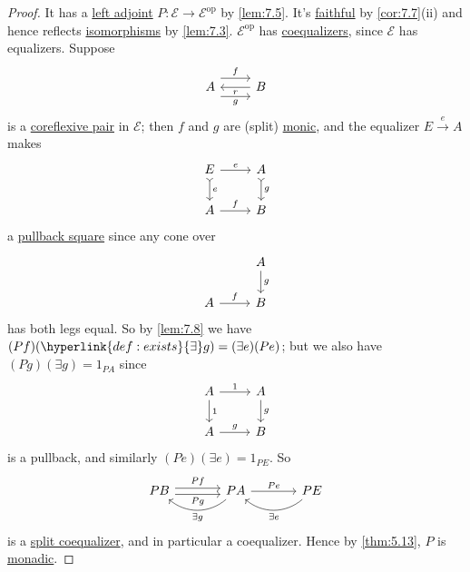 \documentclass{article}
\let\to\longrightarrow
\begin{document}
\begin{proof}
  It has a \hyperlink{def:adj}{left adjoint} $P: \mathscr{E} \to \mathscr{E}^{\text{op}}$ by \cref{lem:7.5}.
  It's \hyperlink{def:full}{faithful} by \cref{cor:7.7}(ii) and hence reflects \hyperlink{def:iso}{isomorphisms} by \cref{lem:7.3}.
  $\mathscr{E}^\text{op}$ has \hyperlink{def:equalizer}{coequalizers}, since $\mathscr{E}$ has equalizers.
  Suppose
  \begin{equation*}
    \begin{tikzcd}
    A \rar[shift left=3]{f} \rar[shift right=3,']{g} & B \lar{r}
    \end{tikzcd}
  \end{equation*}
  is a \hyperlink{def:reflexive}{coreflexive pair} in $\mathscr{E}$; then $f$ and $g$ are (split) \hyperlink{def:monic}{monic}, and the equalizer $E \overset{e}\to A$ makes
  \begin{equation*}
  \begin{tikzcd}
    E \rar{e} \dar[tail]{e} & A \dar[tail]{g} \\ A \rar{f} & B
  \end{tikzcd}
  \end{equation*}
  a \hyperlink{def:pullback}{pullback square} since any cone over
  \begin{equation*}
    \begin{tikzcd}
      &A \dar{g} \\ A \rar{f} & B
    \end{tikzcd}
  \end{equation*}
  has both legs equal.
  So by \cref{lem:7.8} we have $(Pf)(\hyperlink{def:exists}{\exists} g) = (\exists e)(Pe)$; but we also have $(Pg)(\exists g) = 1_{PA}$ since
  \begin{equation*}
  \begin{tikzcd}
    A \rar{1} \dar{1} & A \dar{g} \\
    A \rar{g} & B
  \end{tikzcd}
  \end{equation*}
  is a pullback, and similarly $(Pe)(\exists e) = 1_{PE}$.
  So
  \begin{equation*}
    \begin{tikzcd}[sep=large]
    PB \rar[shift left]{Pf} \rar[shift right,']{Pg} & PA \lar[bend left=40]{\exists g} \rar{Pe} & PE \lar[bend left=40]{\exists e}
  \end{tikzcd}
  \end{equation*}
  is a \hyperlink{def:splitcoeq}{split coequalizer}, and in particular a coequalizer.
  Hence by \cref{thm:5.13}, $P$ is \hyperlink{def:monadic}{monadic}.
\end{proof}
\end{document}

